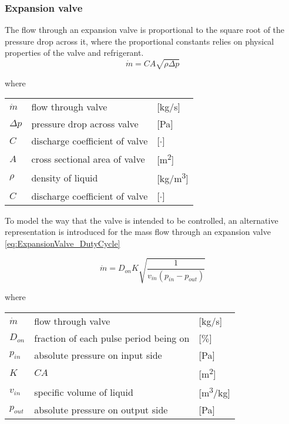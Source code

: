 \subsubsection{Expansion valve}
The flow through an expansion valve is proportional to the square root of the pressure drop across it, where the proportional constants relies on physical properties of the valve and refrigerant.
\begin{equation} \label{eq:ExpansionValve}
	\dot{m}= C A \sqrt{\rho\Delta p}
\end{equation}

where 
\begin{center}
	\begin{tabular}{l p{8cm} l}
		$\dot{m}$ & flow through valve & [\si{kg}/\si{s}]\\ 
		$\Delta p$ & pressure drop across valve & [\si{Pa}]\\
		$C$ & discharge coefficient of valve & [$\cdot$]\\
		$A$ & cross sectional area of valve & [\si{m^2}]\\
		$\rho$ & density of liquid & [\si{kg}/\si{m^3}]\\
		$C$ & discharge coefficient of valve & [$\cdot$]\\
	\end{tabular}
\end{center}

To model the way that the valve is intended to be controlled, an alternative representation is introduced for the mass flow through an expansion valve \cref{eq:ExpansionValve_DutyCycle}

\begin{equation} \label{eq:ExpansionValve_DutyCycle}
	\dot{m}= D_{on} K  \sqrt{\frac{1}{v_{in} (p_{in} - p_{out})}}
\end{equation}

where 
\begin{center}
	\begin{tabular}{l p{8cm} l}
		$\dot{m}$ & flow through valve & [\si{kg}/\si{s}]\\ 
		$D_{on}$ & fraction of each pulse period being on & [$\%$]\\
		$p_{in}$ & absolute pressure on input side & [\si{Pa}]\\
		$K$ & $C A$ & [\si{m^2}]\\
		$v_{in}$ & specific volume of liquid & [\si{m^3}/\si{kg}]\\
		$p_{out}$ & absolute pressure on output side & [\si{Pa}]\\
	\end{tabular}
\end{center}

